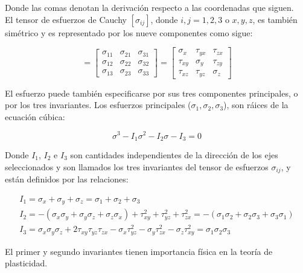 Donde las comas denotan la derivación respecto a las coordenadas que siguen.\\

El tensor de esfuerzos de Cauchy $[\sigma_{ij}]$, donde $i,j = 1,2,3$ o $x,y,z$, es 
también simétrico y es representado por los nueve componentes como sigue:

\begin{equation}
[\sigma_{ij}] = 
\begin{bmatrix}
\sigma_{11} & \sigma_{21} & \sigma_{31} \\
\sigma_{12} & \sigma_{22} & \sigma_{32} \\
\sigma_{13} & \sigma_{23} & \sigma_{33} 
\end{bmatrix}
=
\begin{bmatrix}
\sigma_x & \tau_{yx} & \tau_{zx} \\
\tau_{xy} & \sigma_y & \tau_{zy} \\
\tau_{xz} & \tau_{yz} & \sigma_z 
\end{bmatrix}
\end{equation}

El esfuerzo puede también especificarse por sus tres componentes principales, o por 
los tres invariantes. Los esfuerzos principales ($\sigma_1, \sigma_2, \sigma_3$), son 
ráices de la ecuación cúbica:

\begin{equation}
\sigma^3 - I_1 \sigma^2 - I_2 \sigma - I_3 = 0
\end{equation}

Donde $I_1$, $I_2$ e $I_3$ son cantidades independientes de la dirección de los ejes 
seleccionados y son llamados los tres invariantes del tensor de esfuerzos $\sigma_{ij}$, y están definidos 
por las relaciones:

\begin{align}
I_1 = \sigma_x + \sigma_y + \sigma_z = \sigma_1 + \sigma_2 + \sigma_3 \\
I_2 = -\left( \sigma_x \sigma_y + \sigma_y \sigma_z + \sigma_z \sigma_x \right) + \tau_{xy}^2 + 
\tau_{yz}^2 + \tau_{zx}^2 = -(\sigma_1 \sigma_2 + \sigma_2 \sigma_3 + \sigma_3 \sigma_1) \\
I_3 = \sigma_x \sigma_y \sigma_z + 2 \tau_{xy} \tau_{yz} \tau_{zx} - \sigma_x \tau_{yz}^2 - \sigma_y \tau_{zx}^2 - 
\sigma_z \tau_{xy}^2 = \sigma_1 \sigma_2 \sigma_3
\end{align}

El primer y segundo invariantes tienen importancia física en la teoría de plasticidad.


